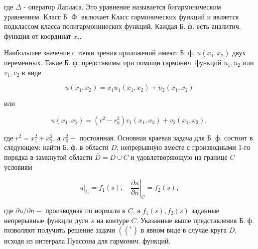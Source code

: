\documentclass[10pt]{article}
\begin{document}
где $\Delta$ - оператор Лапласа. Это уравнение называется бигармоническим уравнением. Класс Б. Ф. включает Класс гармонических функций и является подклассом класса полигармонииеских функций. Каждая Б. ф. есть аналитич. функция от координат $x_{i}$.



Наибольшее значение с точки зрения приложений имеют Б. ф. $u\left(x_{1}, x_{2}\right)$ двух переменных. Такие Б. ф. представимы при помощи гармонич. функций $u_{1}, u_{2}$ или $v_{1}, v_{2}$ в виде



\[

u\left(x_{1}, x_{2}\right)=x_{1} u_{1}\left(x_{1}, x_{2}\right)+u_{2}\left(x_{1}, x_{2}\right)

\]



или



\[

u\left(x_{1}, x_{2}\right)=\left(r^{2}-r_{0}^{2}\right) v_{1}\left(x_{1}, x_{2}\right)+v_{2}\left(x_{1}, x_{2}\right),

\]



где $r^{2}=x_{1}^{2}+x_{2}^{2}$, а $r_{0}^{2}-$ постоянная. Основная краевая задача для Б. ф. состоит в следующем: найти Б. ф. в области $D$, непрерывную вместе с производными 1-го порядка в замкнутой области $\bar{D}=D \cup C$ и удовлетворяющую на границе $C$ условиям



\[

\left.u\right|_{C}=f_{1}(s),\left.\quad \frac{\partial u}{\partial n}\right|_{C}=f_{2}(s),

\]



где $\partial u / \partial n-$ производная по нормали к $C$, а $f_{1}(s), f_{2}(s)$ заданные непрерывные функции дуги $s$ на контуре $C$. Указанные выше представления Б. ф. позволяют получить решение задачи $\left(\left(^{*}\right)\right.$ в явном виде в случае круга $D$, исходя из интеграла Пуассона для гармонич. функций.
\end{document}

